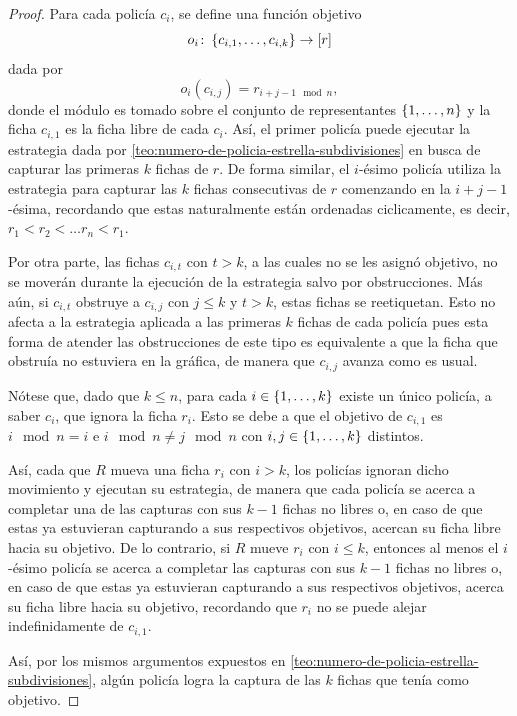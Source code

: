 \begin{proof}
    Para cada polic\'ia $c_i$, se define una funci\'on objetivo
    \[
        o_i \colon \left\{ c_{i,1},\dots,c_{i,k}\right\} \to \left[ r\right]
    \]
    dada por
    \[
        o_i(c_{i,j}) = r_{i+j-1 \mod n},
    \]
    donde el m\'odulo es tomado sobre el conjunto de representantes $\{1,\dots, n\}$
    y la ficha $c_{i,1}$ es la ficha libre de cada $c_i$. As\'i, el primer
    polic\'ia puede ejecutar la estrategia dada por
    \cref{teo:numero-de-policia-estrella-subdivisiones} en busca de capturar las
    primeras $k$ fichas de $r$. De forma similar, el $i$-\'esimo polic\'ia
    utiliza la estrategia para capturar las $k$ fichas consecutivas de $r$
    comenzando en la $i+j-1$-\'esima, recordando que estas naturalmente est\'an
    ordenadas ciclicamente, es decir, $r_1 < r_2 < \dots r_n < r_1$.

    Por otra parte, las fichas $c_{i,t}$ con $t>k$, a las cuales no se les
    asign\'o objetivo, no se mover\'an durante la ejecuci\'on de la estrategia
    salvo por obstrucciones. M\'as a\'un, si $c_{i,t}$ obstruye a $c_{i,j}$ con
    $j\leq k$ y $t>k$, estas fichas se reetiquetan. Esto no afecta a la
    estrategia aplicada a las primeras $k$ fichas de cada polic\'ia pues esta
    forma de atender las obstrucciones de este tipo es equivalente a que la
    ficha que obstru\'ia no estuviera en la gr\'afica, de manera que $c_{i,j}$
    avanza como es usual.
    
    N\'otese que, dado que $k\leq n$, para cada $i\in \{1,\dots, k\}$ existe un
    \'unico polic\'ia, a saber $c_i$, que ignora la ficha $r_i$. Esto se debe a
    que el objetivo de $c_{i,1}$ es $i\mod n = i$ e $i\mod n \neq j\mod n$ con
    $i,j\in \{1,\dots, k\}$ distintos.
    
    \newpage

    As\'i, cada que $R$ mueva una ficha $r_i$ con $i>k$, los polic\'ias ignoran
    dicho movimiento y ejecutan su estrategia, de manera que cada polic\'ia se
    acerca a completar una de las capturas con sus $k-1$ fichas no libres o, en
    caso de que estas ya estuvieran capturando a sus respectivos objetivos,
    acercan su ficha libre hacia su objetivo. De lo contrario, si $R$ mueve
    $r_i$ con $i\leq k$, entonces al menos el $i$-\'esimo polic\'ia se acerca a
    completar las capturas con sus $k-1$ fichas no libres o, en caso de que
    estas ya estuvieran capturando a sus respectivos objetivos, acerca su ficha
    libre hacia su objetivo, recordando que $r_i$ no se puede alejar
    indefinidamente de $c_{i,1}$.

    As\'i, por los mismos argumentos expuestos en
    \cref{teo:numero-de-policia-estrella-subdivisiones}, alg\'un polic\'ia logra
    la captura de las $k$ fichas que ten\'ia como objetivo.

\end{proof}


